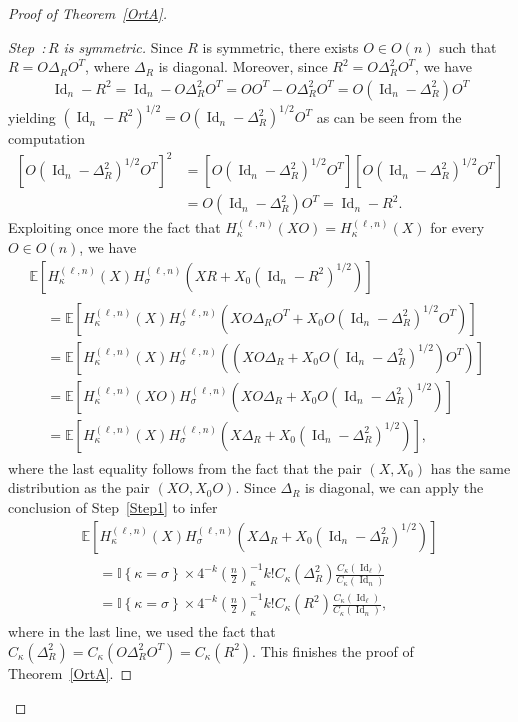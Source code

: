 \documentclass[10pt]{amsart}
\theoremstyle{definition}\newtheorem{defi}[theo]{Definition}\newtheorem{rema}[theo]{Remark}\newtheorem{exam}[theo]{Example}\newtheorem{exem}[theo]{Example}\newtheorem{nota}[theo]{Notation}
\DeclareMathOperator{\Id}{Id}
\newcommand{\E}[1]{\mathbb{E}\left[#1\right]}
\newcommand{\ind}[1]{\mathbb{I}
\left\{#1\right\}}
\newcounter{stepcount}
\newenvironment{step}[1]{\refstepcounter{stepcount}\begin{proof}[{Step~\thestepcount:\,}{#1}]}{\let\qed\relax\end{proof}}
\begin{document}
\begin{proof}[Proof of Theorem~\ref{OrtA}]
\begin{step}{{$R$ is symmetric}}\label{Step2}
Since $R$ is symmetric, there exists $O \in O(n)$ such that $R=O\Delta_R O^T$, where $\Delta_R$ is diagonal. Moreover, since $R^2=O\Delta_R^2O^T$, we have
\begin{gather*}
\Id_n-R^2 = \Id_n-O\Delta_R^2O^T = OO^T-O\Delta_R^2O^T = O\left(\Id_n-\Delta_R^2\right)O^T
\end{gather*}
yielding $(\Id_n-R^2)^{1/2} = O(\Id_n-\Delta_R^2)^{1/2}O^T$ as can be seen from the computation
\begin{align*}
\left[O\left(\Id_n-\Delta_R^2\right)^{1/2}O^T\right]^2 &= \left[O\left(\Id_n-\Delta_R^2\right)^{1/2}O^T\right]\left[O\left(\Id_n-\Delta_R^2\right)^{1/2}O^T\right] \\
&= O\left(\Id_n-\Delta_R^2\right)O^T = \Id_n-R^2.
\end{align*}
Exploiting once more the fact that $H_{\kappa}^{(\ell,n)}(XO) = H_{\kappa}^{(\ell,n)}(X)$ for every $O \in O(n)$, we have
\begin{multline*}
\E{H_{\kappa}^{(\ell,n)}(X) H_{\sigma}^{(\ell,n)}\left(XR+X_0\left(\Id_n-R^2\right)^{1/2}\right)} \\
\begin{aligned}
&= \E{H_{\kappa}^{(\ell,n)}(X) H_{\sigma}^{(\ell,n)}\left(XO \Delta_RO^T+X_0O\left(\Id_n-\Delta_R^2\right)^{1/2}O^T\right)} \\
&=\E{H_{\kappa}^{(\ell,n)}(X) H_{\sigma}^{(\ell,n)}\left(\left(XO \Delta_R +X_0O\left(\Id_n-\Delta_R^2\right)^{1/2}\right)O^T\right)} \\
&=\E{H_{\kappa}^{(\ell,n)}(XO) H_{\sigma}^{(\ell,n)}\left(XO \Delta_R +X_0O\left(\Id_n-\Delta_R^2\right)^{1/2}\right)} \\
&= \E{H_{\kappa}^{(\ell,n)}(X) H_{\sigma}^{(\ell,n)}\left(X \Delta_R +X_0 \left(\Id_n-\Delta_R^2\right)^{1/2}\right)},
\end{aligned}
\end{multline*}
where the last equality follows from the fact that the pair $(X,X_0)$ has the same distribution as the pair $(XO,X_0O)$. Since $\Delta_R$ is diagonal, we can apply the conclusion of Step~\ref{Step1} to infer
\begin{multline*}
\E{H_{\kappa}^{(\ell,n)}(X) H_{\sigma}^{(\ell,n)}\left(X \Delta_R +X_0 \left(\Id_n-\Delta_R^2\right)^{1/2}\right)} \\
\begin{aligned}
&= \ind{\kappa=\sigma}\times 4^{-k}\left(\frac{n}{2}\right)_{\kappa}^{-1} k ! C_{\kappa}\left(\Delta_R^2\right)\frac{C_{\kappa}(\Id_{\ell})}{C_{\kappa}(\Id_n)} \\
&= \ind{\kappa=\sigma}\times 4^{-k}\left(\frac{n}{2}\right)_{\kappa}^{-1} k ! C_{\kappa}\left(R^2\right)\frac{C_{\kappa}(\Id_{\ell})}{C_{\kappa}(\Id_n)},
\end{aligned}
\end{multline*}
where in the last line, we used the fact that $C_{\kappa}(\Delta_R^2) = C_{\kappa}(O\Delta_R^2O^T)= C_{\kappa}(R^2)$. This finishes the proof of Theorem~\ref{OrtA}.\qedhere 
\end{step}\let\qed\relax
\end{proof}
\end{document}
